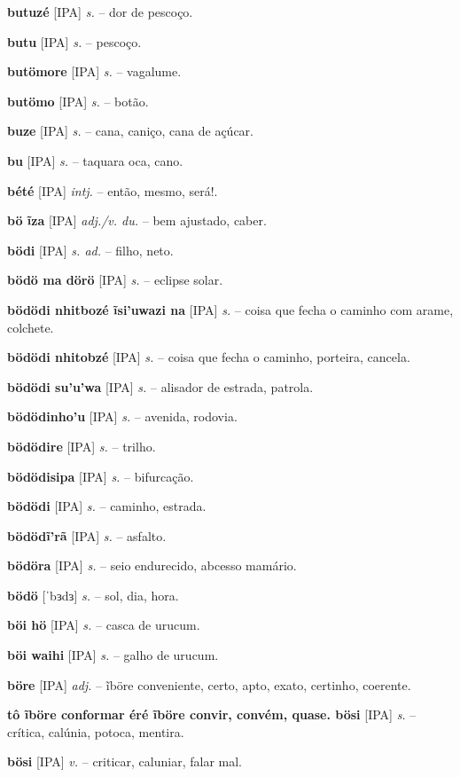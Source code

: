 \textbf{butuzé} [IPA] \textit{s.} -- dor de pescoço.

\textbf{butu} [IPA] \textit{s.} -- pescoço.

\textbf{butömore} [IPA] \textit{s.} -- vagalume.

\textbf{butömo} [IPA] \textit{s.} -- botão.

\textbf{buze} [IPA] \textit{s.} -- cana, caniço, cana de açúcar.

\textbf{bu} [IPA] \textit{s.} -- taquara oca, cano.

\textbf{bété} [IPA] \textit{intj.} -- então, mesmo, será!.

\textbf{bö ĩza} [IPA] \textit{adj./v. du.} -- bem ajustado, caber.

\textbf{bödi} [IPA] \textit{s. ad.} -- filho, neto.

\textbf{bödö ma dörö} [IPA] \textit{s.} -- eclipse solar.

\textbf{bödödi nhitbozé ĩsi'uwazi na} [IPA] \textit{s.} -- coisa que fecha o caminho com arame, colchete.

\textbf{bödödi nhitobzé} [IPA] \textit{s.} -- coisa que fecha o caminho, porteira, cancela.

\textbf{bödödi su'u'wa} [IPA] \textit{s.} -- alisador de estrada, patrola.

\textbf{bödödinho'u} [IPA] \textit{s.} -- avenida, rodovia.

\textbf{bödödire} [IPA] \textit{s.} -- trilho.

\textbf{bödödisipa} [IPA] \textit{s.} -- bifurcação.

\textbf{bödödi} [IPA] \textit{s.} -- caminho, estrada.

\textbf{bödödĩ'rã} [IPA] \textit{s.} -- asfalto.

\textbf{bödöra} [IPA] \textit{s.} -- seio endurecido, abcesso mamário.

\textbf{bödö} [ˈbɜdɜ] \textit{s.} -- sol, dia, hora.

\textbf{böi hö} [IPA] \textit{s.} -- casca de urucum.

\textbf{böi waihi} [IPA] \textit{s.} -- galho de urucum.

\textbf{böre} [IPA] \textit{adj.} -- ĩböre conveniente, certo, apto, exato, certinho, coerente.

\textbf{tô ĩböre conformar  éré ĩböre convir, convém, quase. bösi} [IPA] \textit{s.} -- crítica, calúnia, potoca, mentira.

\textbf{bösi} [IPA] \textit{v.} -- criticar, caluniar, falar mal.

